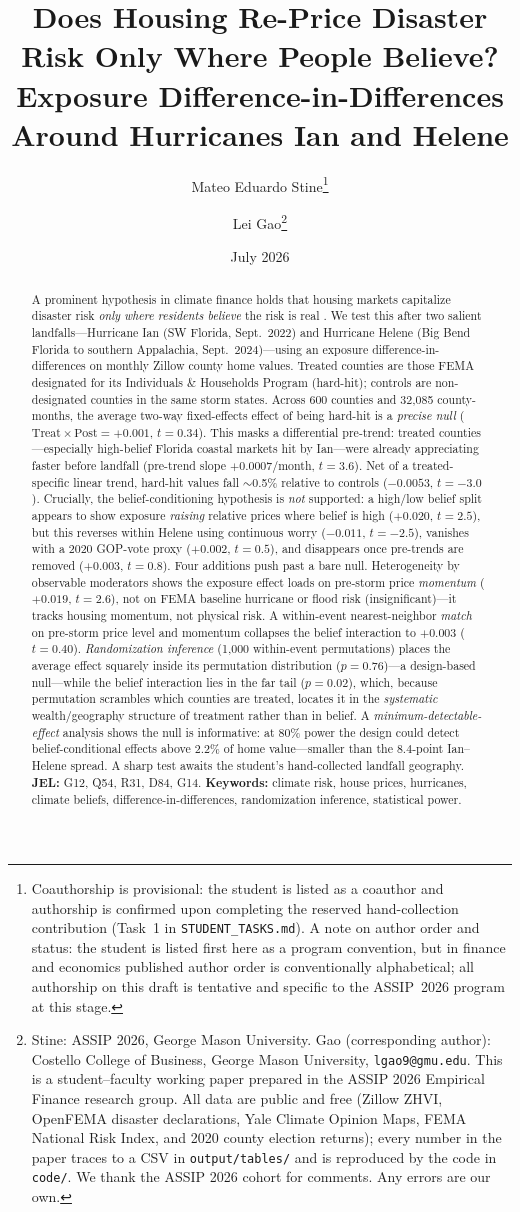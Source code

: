 \documentclass[12pt]{article}
\title{\textbf{Does Housing Re-Price Disaster Risk Only Where People Believe?\\
Exposure Difference-in-Differences Around Hurricanes Ian and Helene}}
\author{Mateo Eduardo Stine\thanks{Coauthorship is provisional: the student is listed as a coauthor and authorship is confirmed upon completing the reserved hand-collection contribution (Task~1 in \texttt{STUDENT\_TASKS.md}). A note on author order and status: the student is listed first here as a program convention, but in finance and economics published author order is conventionally alphabetical; all authorship on this draft is tentative and specific to the ASSIP~2026 program at this stage.} \and Lei Gao\thanks{Stine: ASSIP 2026, George Mason University.
Gao (corresponding author): Costello College of Business, George Mason University,
\texttt{lgao9@gmu.edu}. This is a student--faculty working paper prepared in the ASSIP 2026
Empirical Finance research group. All data are public and free (Zillow ZHVI, OpenFEMA disaster
declarations, Yale Climate Opinion Maps, FEMA National Risk Index, and 2020 county election
returns); every number in the paper traces to a CSV in \texttt{output/tables/} and is reproduced
by the code in \texttt{code/}. We thank the ASSIP 2026 cohort for comments. Any errors are our
own.}}
\date{July 2026}
\begin{document}
\maketitle

\begin{abstract}
\noindent A prominent hypothesis in climate finance holds that housing markets capitalize
disaster risk \emph{only where residents believe} the risk is real \citep{baldauf2020}. We
test this after two salient landfalls---Hurricane Ian (SW Florida, Sept.\ 2022) and Hurricane
Helene (Big Bend Florida to southern Appalachia, Sept.\ 2024)---using an exposure
difference-in-differences on monthly Zillow county home values. Treated counties are those
FEMA designated for its Individuals \& Households Program (hard-hit); controls are
non-designated counties in the same storm states. Across 600 counties and 32{,}085
county-months, the average two-way fixed-effects effect of being hard-hit is a
\emph{precise null} ($\text{Treat}\times\text{Post}=+0.001$, $t=0.34$). This masks a
differential pre-trend: treated counties---especially high-belief Florida coastal markets hit
by Ian---were already appreciating faster before landfall (pre-trend slope
$+0.0007$/month, $t=3.6$). Net of a treated-specific linear trend, hard-hit values fall
$\sim$0.5\% relative to controls ($-0.0053$, $t=-3.0$). Crucially, the belief-conditioning
hypothesis is \emph{not} supported: a high/low belief split appears to show exposure
\emph{raising} relative prices where belief is high ($+0.020$, $t=2.5$), but this reverses
within Helene using continuous worry ($-0.011$, $t=-2.5$), vanishes with a 2020 GOP-vote
proxy ($+0.002$, $t=0.5$), and disappears once pre-trends are removed ($+0.003$, $t=0.8$).
Four additions push past a bare null. Heterogeneity by observable moderators shows the
exposure effect loads on pre-storm price \emph{momentum} ($+0.019$, $t=2.6$), not on FEMA
baseline hurricane or flood risk (insignificant)---it tracks housing momentum, not physical
risk. A within-event nearest-neighbor \emph{match} on pre-storm price level and momentum
collapses the belief interaction to $+0.003$ ($t=0.40$). \emph{Randomization inference}
(1{,}000 within-event permutations) places the average effect squarely inside its permutation
distribution ($p=0.76$)---a design-based null---while the belief interaction lies in the far
tail ($p=0.02$), which, because permutation scrambles which counties are treated, locates it in
the \emph{systematic} wealth/geography structure of treatment rather than in belief. A
\emph{minimum-detectable-effect} analysis shows the null is informative: at 80\% power the
design could detect belief-conditional effects above $2.2\%$ of home value---smaller than the
$8.4$-point Ian--Helene spread. A sharp test awaits the student's hand-collected landfall
geography.\\[4pt]
\noindent\textbf{JEL:} G12, Q54, R31, D84, G14. \quad
\textbf{Keywords:} climate risk, house prices, hurricanes, climate beliefs,
difference-in-differences, randomization inference, statistical power.
\end{abstract}
\end{document}
